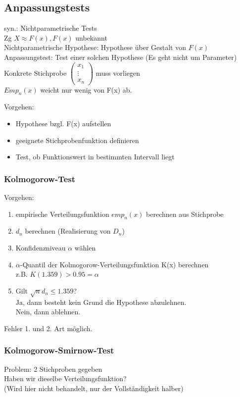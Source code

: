 \documentclass[a4paper,12pt]{scrartcl}
\begin{document}
 \subsection{Anpassungstests}
 syn.: Nichtparametrische Tests\\
 Zg $X\approx F(x), F(x)$ unbekannt\\
 Nichtparametrische Hypothese: Hypothese über Gestalt von $F(x)$\\
 Anpassungstest: Test einer solchen Hypothese (Es geht nicht um Parameter)\\
 Konkrete Stichprobe $\begin{pmatrix}
                       x_1\\\vdots\\x_n
                      \end{pmatrix}$ muss vorliegen\\
 $Emp_n(x)$ weicht nur wenig von F(x) ab.
 
 Vorgehen:
 \begin{itemize}
  \item Hypothese bzgl. F(x) aufstellen
  \item geeignete Stichprobenfunktion definieren
  \item Test, ob Funktionswert in bestimmten Intervall liegt
 \end{itemize}

 \subsubsection{Kolmogorow-Test}
 Vorgehen:
 \begin{enumerate}
  \item empirische Verteilungsfunktion $emp_n(x)$ berechnen aus Stichprobe
  \item $d_n$ berechnen (Realisierung von $D_n$)
  \item Konfidenzniveau $\alpha$ wählen
  \item $\alpha$-Quantil der Kolmogorow-Verteilungsfunktion K(x) berechnen\\
  z.B. $K(1.359)>0.95=\alpha$
  \item Gilt $\sqrt{n}d_n\leq 1.359$?\\
  Ja, dann besteht kein Grund die Hypothese abzulehnen.\\
  Nein, dann ablehnen.
 \end{enumerate}
 Fehler 1. und 2. Art möglich.
 
 \subsubsection{Kolmogorow-Smirnow-Test}
 Problem: 2 Stichproben gegeben\\
 Haben wir dieselbe Verteilungsfunktion?\\
 (Wird hier nicht behandelt, nur der Vollständigkeit halber)
\end{document}
